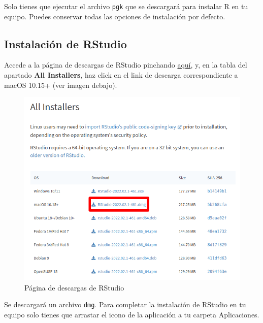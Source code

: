 \documentclass[
  title=normal,
  notoc,
  bib=normal]{mnye}
\begin{document}
Solo tienes que ejecutar el archivo \texttt{pgk} que se descargará para instalar R en tu equipo. Puedes conservar todas las opciones de instalación por defecto.

\hypertarget{instalaciuxf3n-de-rstudio-2}{%
\subsection{Instalación de RStudio}\label{instalaciuxf3n-de-rstudio-2}}

Accede a la página de descargas de RStudio pinchando \href{https://rstudio.com/products/rstudio/download/\#download}{aquí}, y, en la tabla del apartado \textbf{All Installers}, haz click en el link de descarga correspondiente a macOS 10.15+ (ver imagen debajo).

\begin{figure}

{\centering \includegraphics[width=0.9\linewidth]{images/rstudio-mac} 

}

\caption{Página de descargas de RStudio}\label{fig:unnamed-chunk-16}
\end{figure}

Se descargará un archivo \texttt{dmg}. Para completar la instalación de RStudio en tu equipo solo tienes que arrastar el icono de la aplicación a tu carpeta Aplicaciones.

\printbibliography

%
\end{document}
